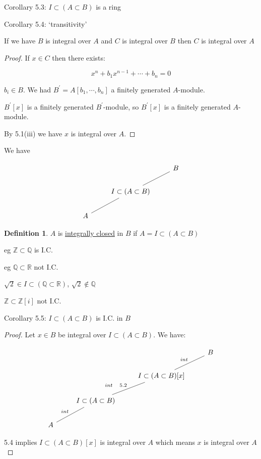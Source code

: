 \documentclass{article}
\theoremstyle{definition}
\newtheorem{definition}{Definition}
\begin{document}
Corollary 5.3: \(I \subset (A \subset B)\)  is a ring

Corollary 5.4: `transitivity'

If we have \(B\) is integral over \(A\) and \(C\) is integral over \(B\) then \(C\) is integral over \(A\) 

\begin{proof}
    If \(x\in C\) then there exists:

    \[
        x^n + b_1 x^{n-1} + \cdots + b_n = 0 
    \]

    \(b_i \in B\). We had \(B^{\prime} = A[b_1,\cdots,b_n]\) a finitely generated \(A\)-module.

    \(B^{\prime} [x]\) is a finitely generated \(B^{\prime}\)-module, so \(B^{\prime} [x]\) is a finitely generated \(A\)-module.
    
    By 5.1(iii) we have \(x\) is integral over \(A\).
\end{proof}

We have

\[
    \begin{tikzcd}
        & & B \\
        & I \subset (A \subset B) \ar[ur, no head] & \\
        A \ar[ur, no head] & &
    \end{tikzcd}
\]

\begin{definition}
    \(A\) is \underline{integrally closed} in \(B\) if \(A = I \subset (A \subset B)\) 
\end{definition}

eg \(\mathbb{Z} \subset \mathbb{Q}\) is I.C.

eg \(\mathbb{Q} \subset \mathbb{R}\) not I.C.

\(\sqrt{2}\in I \subset (\mathbb{Q} \subset \mathbb{R}) \), \(\sqrt{2} \notin \mathbb{Q}\)

\(\mathbb{Z} \subset \mathbb{Z} [i]\) not I.C.

Corollary 5.5: \(I \subset (A \subset B)\) is I.C. in \(B\) 

\begin{proof}
    Let \(x\in B\) be integral over \(I \subset (A \subset B)\). We have:
    
    \[
        \begin{tikzcd}
            & & & B\\
            & & I \subset (A \subset B)[x] \ar[ur, no head, "int"] & \\
            & I \subset (A \subset B) \ar[ur, no head, "int\quad 5.2"] & & \\
            A \ar[ur, no head, "int"] & & &
        \end{tikzcd}
    \]

    5.4 implies \(I \subset (A \subset B)[x]\) is integral over \(A\) which means \(x\) is integral over \(A\) 
\end{proof}
\end{document}
